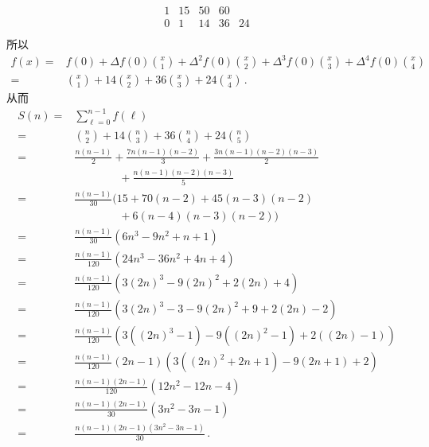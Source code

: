 \begin{example}
\begin{align*}
{\begin{array}{ccccc}
                    1   & 15  & 50  & 60 & \  \\
                    0   & 1   & 14  & 36 & 24 \\
                \end{array}
            }
    \end{align*}
    所以
    \begin{align*}
        f(x)
        = {} & f(0) + \Delta f(0) \binom{x}{1} + \Delta^2 f(0) \binom{x}{2} + \Delta^3 f(0) \binom{x}{3} + \Delta^4 f(0) \binom{x}{4} \\
        = {} & \binom{x}{1} + 14 \binom{x}{2} + 36 \binom{x}{3} + 24 \binom{x}{4} \period
    \end{align*}
    从而
    \begin{align*}
        S(n)
        = {} & \sum_{\ell = 0}^{n - 1} f(\ell)                                         \\
        = {} & \binom{n}{2} + 14 \binom{n}{3} + 36 \binom{n}{4} + 24 \binom{n}{5}      \\
        = {} & \frac{n(n-1)}{2} + \frac{7n(n-1)(n-2)}{3} + \frac{3n(n-1)(n-2)(n-3)}{2} \\
             & \qquad \qquad + \frac{n(n-1)(n-2)(n-3)}{5}                              \\
        = {} & \frac{n(n-1)}{30} (15 + 70(n-2) + 45(n-3)(n-2)                          \\
             & \qquad \qquad + 6(n-4)(n-3)(n-2))                                       \\
        = {} & \frac{n(n-1)}{30} (6n^3 - 9n^2 + n + 1)                                 \\
        = {} & \frac{n(n-1)}{120} (24n^3 - 36n^2 + 4n + 4)                             \\
        = {} & \frac{n(n-1)}{120} (3(2n)^3 - 9(2n)^2 + 2(2n) + 4)                      \\
        = {} & \frac{n(n-1)}{120} (3(2n)^3 - 3 - 9(2n)^2 + 9 + 2(2n) - 2)              \\
        = {} & \frac{n(n-1)}{120} (3((2n)^3 - 1) - 9((2n)^2 - 1) + 2((2n) - 1))        \\
        = {} & \frac{n(n-1)}{120} (2n-1) (3((2n)^2 + 2n + 1) - 9(2n + 1) + 2)          \\
        = {} & \frac{n(n-1)(2n-1)}{120} (12n^2 - 12n - 4)                              \\
        = {} & \frac{n(n-1)(2n-1)}{30} (3n^2 - 3n - 1)                                 \\
        = {} & \frac{n(n-1)(2n-1)(3n^2 - 3n - 1)}{30} \period
    \end{align*}
\end{example}
